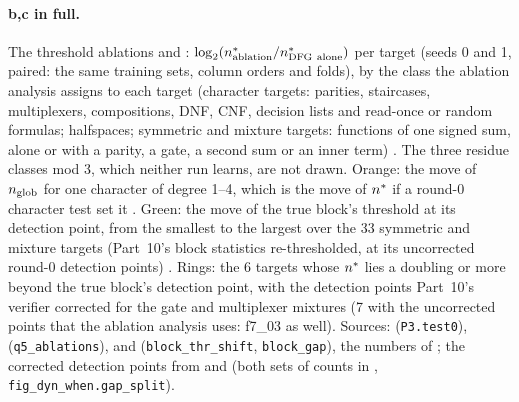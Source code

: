 \paragraph{b,c in full.} The threshold ablations  and : $\log_2(\nstar_{\rm ablation}/\nstar_{\rm DFG\ alone})$ per target (seeds 0 and 1, paired: the same training sets, column orders and folds), by the class the ablation analysis assigns to each target (character targets: parities, staircases, multiplexers, compositions, DNF, CNF, decision lists and read-once or random formulas; halfspaces; symmetric and mixture targets: functions of one signed sum, alone or with a parity, a gate, a second sum or an inner term) . The three residue classes mod 3, which neither run learns, are not drawn. Orange: the move of $n_{\rm glob}$ for one character of degree 1--4, which is the move of $n^{*}$ if a round-0 character test set it . Green: the move of the true block's threshold at its detection point, from the smallest to the largest over the 33 symmetric and mixture targets (Part~10's block statistics re-thresholded, at its uncorrected round-0 detection points) . Rings: the 6 targets whose $n^{*}$ lies a doubling or more beyond the true block's detection point, with the detection points Part~10's verifier corrected for the gate and multiplexer mixtures (7 with the uncorrected points that the ablation analysis uses: f7\_03 as well). Sources:  (\texttt{P3.test0}),  (\texttt{q5\_ablations}),  and  (\texttt{block\_thr\_shift}, \texttt{block\_gap}), the numbers of ; the corrected detection points from  and  (both sets of counts in , \texttt{fig\_dyn\_when.gap\_split}).

